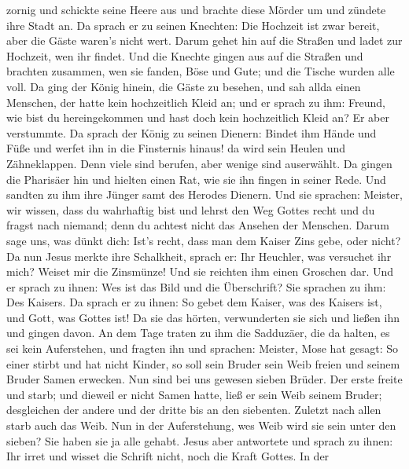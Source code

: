 zornig und schickte seine Heere aus und brachte diese Mörder um und
zündete ihre Stadt an.  Da sprach er zu seinen Knechten: Die
Hochzeit ist zwar bereit, aber die Gäste waren's nicht wert.
 Darum gehet hin auf die Straßen und ladet zur Hochzeit, wen
ihr findet.  Und die Knechte gingen aus auf die Straßen und
brachten zusammen, wen sie fanden, Böse und Gute; und die Tische wurden
alle voll.  Da ging der König hinein, die Gäste zu besehen,
und sah allda einen Menschen, der hatte kein hochzeitlich Kleid an;
 und er sprach zu ihm: Freund, wie bist du hereingekommen
und hast doch kein hochzeitlich Kleid an? Er aber verstummte.
 Da sprach der König zu seinen Dienern: Bindet ihm Hände
und Füße und werfet ihn in die Finsternis hinaus! da wird sein Heulen
und Zähneklappen.  Denn viele sind berufen, aber wenige
sind auserwählt.  Da gingen die Pharisäer hin und hielten
einen Rat, wie sie ihn fingen in seiner Rede.  Und sandten
zu ihm ihre Jünger samt des Herodes Dienern. Und sie sprachen: Meister,
wir wissen, dass du wahrhaftig bist und lehrst den Weg Gottes recht und
du fragst nach niemand; denn du achtest nicht das Ansehen der Menschen.
 Darum sage uns, was dünkt dich: Ist's recht, dass man dem
Kaiser Zins gebe, oder nicht?  Da nun Jesus merkte ihre
Schalkheit, sprach er: Ihr Heuchler, was versuchet ihr mich?
 Weiset mir die Zinsmünze! Und sie reichten ihm einen
Groschen dar.  Und er sprach zu ihnen: Wes ist das Bild und
die Überschrift?  Sie sprachen zu ihm: Des Kaisers. Da
sprach er zu ihnen: So gebet dem Kaiser, was des Kaisers ist, und Gott,
was Gottes ist!  Da sie das hörten, verwunderten sie sich
und ließen ihn und gingen davon.  An dem Tage traten zu ihm
die Sadduzäer, die da halten, es sei kein Auferstehen, und fragten ihn
 und sprachen: Meister, Mose hat gesagt: So einer stirbt
und hat nicht Kinder, so soll sein Bruder sein Weib freien und seinem
Bruder Samen erwecken.  Nun sind bei uns gewesen sieben
Brüder. Der erste freite und starb; und dieweil er nicht Samen hatte,
ließ er sein Weib seinem Bruder;  desgleichen der andere
und der dritte bis an den siebenten.  Zuletzt nach allen
starb auch das Weib.  Nun in der Auferstehung, wes Weib
wird sie sein unter den sieben? Sie haben sie ja alle gehabt.
 Jesus aber antwortete und sprach zu ihnen: Ihr irret und
wisset die Schrift nicht, noch die Kraft Gottes.  In der
